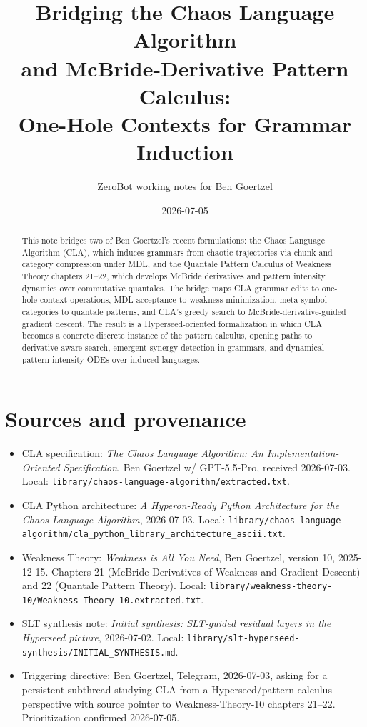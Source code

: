 \documentclass[11pt]{article}
\title{Bridging the Chaos Language Algorithm\\
and McBride-Derivative Pattern Calculus:\\
One-Hole Contexts for Grammar Induction}
\author{ZeroBot working notes for Ben Goertzel}
\date{2026-07-05}
\begin{document}
\maketitle

\begin{abstract}
This note bridges two of Ben Goertzel's recent formulations: the Chaos Language Algorithm (CLA), which induces grammars from chaotic trajectories via chunk and category compression under MDL, and the Quantale Pattern Calculus of Weakness Theory chapters 21--22, which develops McBride derivatives and pattern intensity dynamics over commutative quantales.  The bridge maps CLA grammar edits to one-hole context operations, MDL acceptance to weakness minimization, meta-symbol categories to quantale patterns, and CLA's greedy search to McBride-derivative-guided gradient descent.  The result is a Hyperseed-oriented formalization in which CLA becomes a concrete discrete instance of the pattern calculus, opening paths to derivative-aware search, emergent-synergy detection in grammars, and dynamical pattern-intensity ODEs over induced languages.
\end{abstract}

\tableofcontents

\section{Sources and provenance}

\begin{itemize}
  \item CLA specification: \emph{The Chaos Language Algorithm: An Implementation-Oriented Specification}, Ben Goertzel w/ GPT-5.5-Pro, received 2026-07-03.  Local: \texttt{library/chaos-language-algorithm/extracted.txt}.
  \item CLA Python architecture: \emph{A Hyperon-Ready Python Architecture for the Chaos Language Algorithm}, 2026-07-03.  Local: \texttt{library/chaos-language-algorithm/cla\_python\_library\_architecture\_ascii.txt}.
  \item Weakness Theory: \emph{Weakness is All You Need}, Ben Goertzel, version 10, 2025-12-15.  Chapters 21 (McBride Derivatives of Weakness and Gradient Descent) and 22 (Quantale Pattern Theory).  Local: \texttt{library/weakness-theory-10/Weakness-Theory-10.extracted.txt}.
  \item SLT synthesis note: \emph{Initial synthesis: SLT-guided residual layers in the Hyperseed picture}, 2026-07-02.  Local: \texttt{library/slt-hyperseed-synthesis/INITIAL\_SYNTHESIS.md}.
  \item Triggering directive: Ben Goertzel, Telegram, 2026-07-03, asking for a persistent subthread studying CLA from a Hyperseed/pattern-calculus perspective with source pointer to Weakness-Theory-10 chapters 21--22.  Prioritization confirmed 2026-07-05.
\end{itemize}
\end{document}
